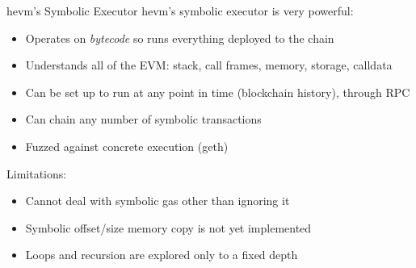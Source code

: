 \documentclass[aspectratio=169]{beamer}
\begin{document}
\begin{frame}{hevm's Symbolic Executor}
hevm's symbolic executor is very powerful:
\begin{itemize}
\item Operates on \emph{bytecode} so runs everything deployed to the chain
\item Understands all of the EVM: stack, call frames, memory, storage, calldata
\item Can be set up to run at any point in time (blockchain history), through RPC
\item Can chain any number of symbolic transactions
\item Fuzzed against concrete execution (geth)
\end{itemize}
\bigskip

Limitations:
\begin{itemize}
\item Cannot deal with symbolic gas other than ignoring it
\item Symbolic offset/size memory copy is not yet implemented
\item Loops and recursion are explored only to a fixed depth
\end{itemize}
\end{frame}
\end{document}
